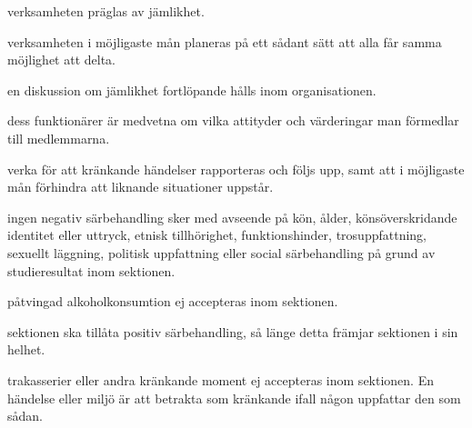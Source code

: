 \documentclass{dsekprotokoll}
\begin{document}
\begin{attlista}
	\item verksamheten präglas av jämlikhet.
	\item verksamheten i möjligaste mån planeras på ett sådant sätt att alla får samma möjlighet att delta.
	\item en diskussion om jämlikhet fortlöpande hålls inom organisationen.
	\item dess funktionärer är medvetna om vilka attityder och värderingar man förmedlar till
	medlemmarna.
	\item verka för att kränkande händelser rapporteras och följs upp, samt att i möjligaste mån
	förhindra att liknande situationer uppstår.
	\item ingen negativ särbehandling sker med avseende på kön, ålder, könsöverskridande identitet eller uttryck, etnisk tillhörighet, funktionshinder, trosuppfattning, sexuellt läggning,
	politisk uppfattning eller social särbehandling på grund av studieresultat inom sektionen.
	\item påtvingad alkoholkonsumtion ej accepteras inom sektionen.
	\item sektionen ska tillåta positiv särbehandling, så länge detta främjar sektionen i sin helhet.
	\item trakasserier eller andra kränkande moment ej accepteras inom sektionen. En händelse
	eller miljö är att betrakta som kränkande ifall någon uppfattar den som sådan.
\end{attlista}
\end{document}
